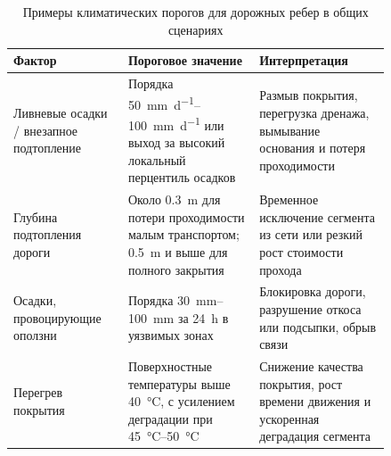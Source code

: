 \begin{table}[ht]
\centering
\caption{Примеры климатических порогов для дорожных ребер в общих сценариях}
\label{tab:road-climate-thresholds}
\begin{tabular}{p{0.24\linewidth} p{0.30\linewidth} p{0.30\linewidth}}
\hline
\textbf{Фактор} & \textbf{Пороговое значение} & \textbf{Интерпретация} \\
\hline
Ливневые осадки / внезапное подтопление & Порядка \SIrange{50}{100}{\milli\meter\per\day} или выход за высокий локальный перцентиль осадков & Размыв покрытия, перегрузка дренажа, вымывание основания и потеря проходимости \\
\hline
Глубина подтопления дороги & Около \SI{0.3}{\meter} для потери проходимости малым транспортом; \SI{0.5}{\meter} и выше для полного закрытия & Временное исключение сегмента из сети или резкий рост стоимости прохода \\
\hline
Осадки, провоцирующие оползни & Порядка \SIrange{30}{100}{\milli\meter} за \SI{24}{\hour} в уязвимых зонах & Блокировка дороги, разрушение откоса или подсыпки, обрыв связи \\
\hline
Перегрев покрытия & Поверхностные температуры выше \SI{40}{\celsius}, с усилением деградации при \SIrange{45}{50}{\celsius} & Снижение качества покрытия, рост времени движения и ускоренная деградация сегмента \\
\hline
\end{tabular}
\end{table}

